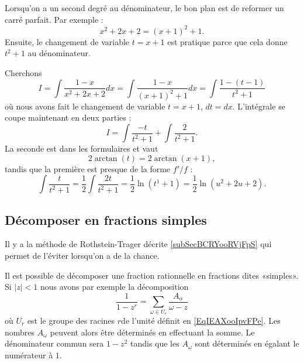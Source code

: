 Lorsqu'on a un second degré au dénominateur, le bon plan est de reformer un carré parfait. Par exemple : 
\begin{equation}
	x^2+2x+2=(x+1)^2+1.
\end{equation}
Ensuite, le changement de variable $t=x+1$ est pratique parce que cela donne $t^2+1$ au dénominateur.

Cherchons
\begin{equation}
	I=\int \frac{ 1-x }{ x^2+2x+2 }dx=\int\frac{ 1-x }{ (x+1)^2+1 }dx=\int\frac{ 1-(t-1) }{ t^2+1 }
\end{equation}
où nous avons fait le changement de variable $t=x+1$, $dt=dx$. L'intégrale se coupe maintenant en deux parties :
\begin{equation}
	I=\int\frac{ -t }{ t^2+1 }+\int \frac{ 2 }{ t^2+1 }.
\end{equation}
La seconde est dans les formulaires et vaut 
\begin{equation}
	2\arctan(t)=2\arctan(x+1),
\end{equation}
tandis que la première est presque de la forme $f'/f$ :
\begin{equation}
	\int\frac{ t }{ t^2+1 }=\frac{ 1 }{2}\int \frac{ 2t }{ t^2+1 }=\frac{ 1 }{2}\ln(t^1+1)=\frac{ 1 }{2}\ln(u^2+2u+2).
\end{equation}

\subsection{Décomposer en fractions simples}
Il y a la méthode de Rothstein-Trager décrite \ref{subSecBCRYooRVjFpS} qui permet de l'éviter lorsqu'on a de la chance.

Il est possible de décomposer une fraction rationnelle en fractions dites «simples». Si \( | z |<1\) nous avons par exemple la décomposition
\begin{equation}        \label{EqDWYBooJIMBAt}
    \frac{1}{ 1-z^r }=\sum_{\omega\in U_r}\frac{ A_{\alpha} }{ \omega-z }
\end{equation}
où \( U_r\) est le groupe des racines \( r\)\ieme de l'unité définit en \eqref{EqIEAXooIpvFPe}. Les nombres \( A_{\omega}\) peuvent alors être déterminés en effectuant la somme. Le dénominateur commun sera \( 1-z^2\) tandis que les \( A_{\omega}\) sont déterminés en égalant le numérateur à \( 1\).

